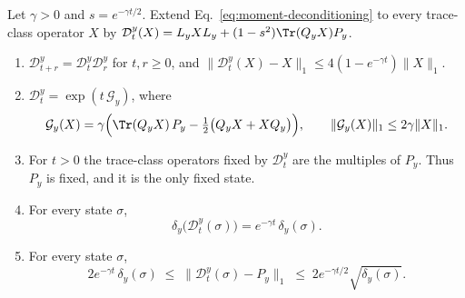 \begin{proposition}
\label{prop:relaxation-semigroup}
Let $\gamma>0$ and $s=e^{-\gamma t/2}$. Extend Eq.~\eqref{eq:moment-deconditioning} to every trace-class operator $X$ by $\mathcal D_t^y(X)=L_yXL_y+(1-s^2)\Tr(Q_yX)P_y$.
\begin{enumerate}
\item[(a)] $\mathcal D_{t+r}^y=\mathcal D_t^y\mathcal D_r^y$ for $t,r\ge0$, and $\|\mathcal D_t^y(X)-X\|_1\le4(1-e^{-\gamma t})\|X\|_1$.
\item[(b)] $\mathcal D_t^y=\exp(t\,\mathcal G_y)$, where
\begin{equation}
 \mathcal G_y(X)=\gamma\Bigl(\Tr(Q_yX)\,P_y-\tfrac12\bigl(Q_yX+XQ_y\bigr)\Bigr),
 \qquad \|\mathcal G_y(X)\|_1\le2\gamma\|X\|_1 .
 \label{eq:relaxation-generator}
\end{equation}
\item[(c)] For $t>0$ the trace-class operators fixed by $\mathcal D_t^y$ are the multiples of $P_y$. Thus $P_y$ is fixed, and it is the only fixed state.
\item[(d)] For every state $\sigma$,
\begin{equation}
 \delta_y\bigl(\mathcal D_t^y(\sigma)\bigr)=e^{-\gamma t}\,\delta_y(\sigma).
 \label{eq:relaxation-decay}
\end{equation}
\item[(e)] For every state $\sigma$,
\begin{equation}
 2e^{-\gamma t}\,\delta_y(\sigma)\;\le\;\bigl\|\mathcal D_t^y(\sigma)-P_y\bigr\|_1\;\le\;2e^{-\gamma t/2}\sqrt{\delta_y(\sigma)} .
 \label{eq:relaxation-distance}
\end{equation}
\end{enumerate}
\end{proposition}
